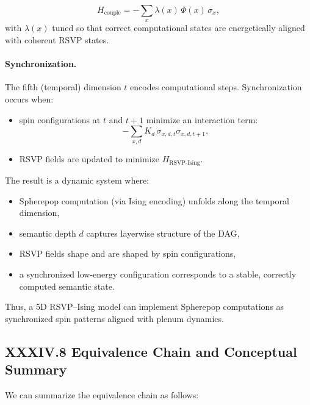 \documentclass[12pt,letterpaper]{article}
\begin{document}
\[
H_{\text{couple}} = -\sum_x \lambda(x)\, \Phi(x)\, \sigma_x,
\]
with $\lambda(x)$ tuned so that correct computational states are energetically aligned with coherent RSVP states.

\paragraph{Synchronization.}
The fifth (temporal) dimension $t$ encodes computational steps. Synchronization occurs when:

\begin{itemize}
  \item spin configurations at $t$ and $t+1$ minimize an interaction term:
  \[
  -\sum_{x,d} K_{d}\, \sigma_{x,d,t} \sigma_{x,d,t+1},
  \]
  \item RSVP fields are updated to minimize $H_{\text{RSVP-Ising}}$.
\end{itemize}

The result is a dynamic system where:

\begin{itemize}
  \item Spherepop computation (via Ising encoding) unfolds along the temporal dimension,
  \item semantic depth $d$ captures layerwise structure of the DAG,
  \item RSVP fields shape and are shaped by spin configurations,
  \item a synchronized low-energy configuration corresponds to a stable, correctly computed semantic state.
\end{itemize}

Thus, a 5D RSVP--Ising model can implement Spherepop computations as synchronized spin patterns aligned with plenum dynamics.

\subsection{XXXIV.8 Equivalence Chain and Conceptual Summary}

We can summarize the equivalence chain as follows:
\end{document}
